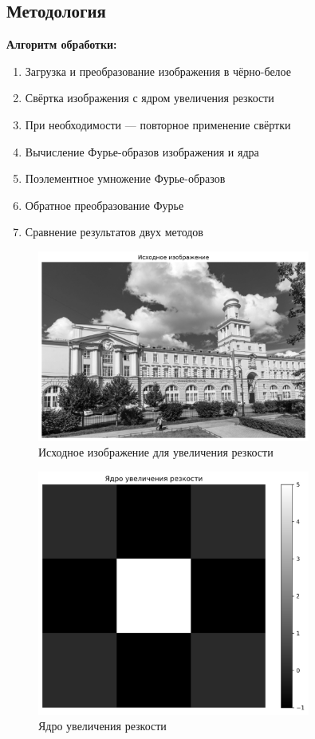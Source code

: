 \subsection*{Методология}

\textbf{Алгоритм обработки:}
\begin{enumerate}
    \item Загрузка и преобразование изображения в чёрно-белое
    \item Свёртка изображения с ядром увеличения резкости
    \item При необходимости — повторное применение свёртки
    \item Вычисление Фурье-образов изображения и ядра
    \item Поэлементное умножение Фурье-образов
    \item Обратное преобразование Фурье
    \item Сравнение результатов двух методов
\end{enumerate}

\begin{figure}[H]
    \centering
    \includegraphics[width=0.8\textwidth]{images/task3/original_image.png}
    \caption{Исходное изображение для увеличения резкости}
    \label{fig:original_sharp}
\end{figure}

\begin{figure}[H]
    \centering
    \includegraphics[width=0.8\textwidth]{images/task3/sharpening_kernel.png}
    \caption{Ядро увеличения резкости}
    \label{fig:sharpening_kernel}
\end{figure}

